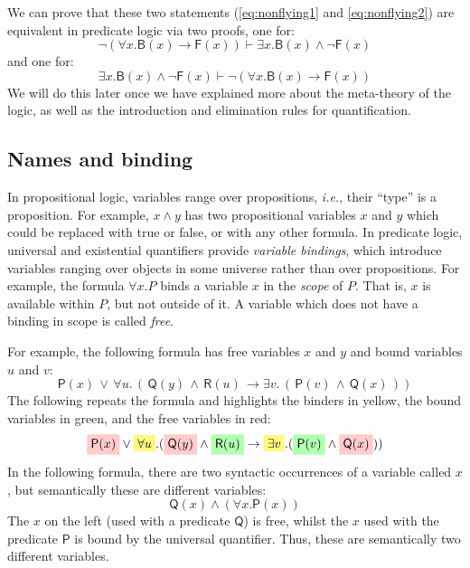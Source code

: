 \documentclass{article}
\theoremstyle{definition}
\newcommand{\highlight}[1]{%
  \colorbox{yellow!50}{$\displaystyle#1$}}
\newcommand{\highlightG}[1]{%
  \colorbox{green!30}{$\displaystyle#1$}}
\newcommand{\highlightR}[1]{%
  \colorbox{red!20}{$\displaystyle#1$}}
\newcommand{\rel}[1]{\mathsf{#1}}
\newcommand{\ie}{\emph{i.e.}}
\begin{document}
We can prove that these two statements (\eqref{eq:nonflying1} and
\eqref{eq:nonflying2}) are equivalent in predicate logic via two
proofs, one for:
$$\neg (\forall x . \rel{B}(x) \rightarrow \rel{F}(x)) \vdash
\exists x . \rel{B}(x) \wedge \neg \rel{F}(x)$$
and one for:
$$
\exists x . \rel{B}(x) \wedge \neg \rel{F}(x) \vdash
\neg (\forall x . \rel{B}(x) \rightarrow \rel{F}(x))
$$
We will do this later once we have explained more about the
meta-theory of the logic, as well as the introduction and elimination
rules for quantification.

\subsection{Names and binding}

In propositional logic, variables range over propositions, \ie{},
their ``type'' is a proposition. For example, $x \wedge y$ has two
propositional variables $x$ and $y$ which could be replaced with true
or false, or with any other formula. In predicate logic, universal and
existential quantifiers provide \emph{variable bindings}, which
introduce variables ranging over objects in some universe rather than
over propositions. For example, the formula $\forall x . P$ binds
a variable $x$ in the \emph{scope} of $P$. That is, $x$
is available within $P$, but not outside of it. A variable which does
not have a binding in scope is called \emph{free}.

For example, the following formula has free variables $x$ and $y$
and bound variables $u$ and $v$:
%
\begin{equation*}
\rel{P}(x) \, \vee  \, \forall u . \, (\, \rel{Q}(y) \, \wedge \,
\rel{R}(u) \, \rightarrow \exists v . \, (\, \rel{P}(v) \, \wedge \, \rel{Q}(x) \,))
\end{equation*}
%
The following repeats the formula and 
highlights the binders in yellow, the bound variables
in green, and the free variables in red:
%
\begin{equation*}
\highlightR{\rel{P}(x)} \vee \highlight{\forall u} . (\highlightR{\rel{Q}(y)} \wedge \highlightG{\rel{R}(u)}
\rightarrow \highlight{\exists v} .
(\highlightG{\rel{P}(v)} \wedge \highlightR{\rel{Q}(x)}))
\end{equation*}
%
%
In the following formula, there are two syntactic occurrences of a
variable called $x$, but semantically these are different variables:
%
\begin{equation*}
\rel{Q}(x) \wedge (\forall x . \rel{P}(x))
\end{equation*}
%
The $x$ on the left (used with a predicate $\mathsf{Q}$) is free,
whilst the $x$ used with the predicate $\rel{P}$ is bound by the
universal quantifier. Thus, these are semantically two different
variables.
\end{document}
